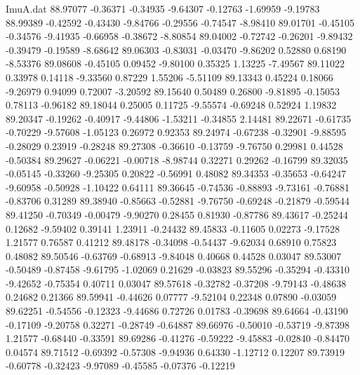 \begin{filecontents}{ImuA.dat}
  88.97077   -0.36371   -0.34935   -9.64307   -0.12763   -1.69959   -9.19783
  88.99389   -0.42592   -0.43430   -9.84766   -0.29556   -0.74547   -8.98410
  89.01701   -0.45105   -0.34576   -9.41935   -0.66958   -0.38672   -8.80854
  89.04002   -0.72742   -0.26201   -9.89432   -0.39479   -0.19589   -8.68642
  89.06303   -0.83031   -0.03470   -9.86202    0.52880    0.68190   -8.53376
  89.08608   -0.45105    0.09452   -9.80100    0.35325    1.13225   -7.49567
  89.11022    0.33978    0.14118   -9.33560    0.87229    1.55206   -5.51109
  89.13343    0.45224    0.18066   -9.26979    0.94099    0.72007   -3.20592
  89.15640    0.50489    0.26800   -9.81895   -0.15053    0.78113   -0.96182
  89.18044    0.25005    0.11725   -9.55574   -0.69248    0.52924    1.19832
  89.20347   -0.19262   -0.40917   -9.44806   -1.53211   -0.34855    2.14481
  89.22671   -0.61735   -0.70229   -9.57608   -1.05123    0.26972    0.92353
  89.24974   -0.67238   -0.32901   -9.88595   -0.28029    0.23919   -0.28248
  89.27308   -0.36610   -0.13759   -9.76750    0.29981    0.44528   -0.50384
  89.29627   -0.06221   -0.00718   -8.98744    0.32271    0.29262   -0.16799
  89.32035   -0.05145   -0.33260   -9.25305    0.20822   -0.56991    0.48082
  89.34353   -0.35653   -0.64247   -9.60958   -0.50928   -1.10422    0.64111
  89.36645   -0.74536   -0.88893   -9.73161   -0.76881   -0.83706    0.31289
  89.38940   -0.85663   -0.52881   -9.76750   -0.69248   -0.21879   -0.59544
  89.41250   -0.70349   -0.00479   -9.90270    0.28455    0.81930   -0.87786
  89.43617   -0.25244    0.12682   -9.59402    0.39141    1.23911   -0.24432
  89.45833   -0.11605    0.02273   -9.17528    1.21577    0.76587    0.41212
  89.48178   -0.34098   -0.54437   -9.62034    0.68910    0.75823    0.48082
  89.50546   -0.63769   -0.68913   -9.84048    0.40668    0.44528    0.03047
  89.53007   -0.50489   -0.87458   -9.61795   -1.02069    0.21629   -0.03823
  89.55296   -0.35294   -0.43310   -9.42652   -0.75354    0.40711    0.03047
  89.57618   -0.32782   -0.37208   -9.79143   -0.48638    0.24682    0.21366
  89.59941   -0.44626    0.07777   -9.52104    0.22348    0.07890   -0.03059
  89.62251   -0.54556   -0.12323   -9.44686    0.72726    0.01783   -0.39698
  89.64664   -0.43190   -0.17109   -9.20758    0.32271   -0.28749   -0.64887
  89.66976   -0.50010   -0.53719   -9.87398    1.21577   -0.68440   -0.33591
  89.69286   -0.41276   -0.59222   -9.45883   -0.02840   -0.84470    0.04574
  89.71512   -0.69392   -0.57308   -9.94936    0.64330   -1.12712    0.12207
  89.73919   -0.60778   -0.32423   -9.97089   -0.45585   -0.07376   -0.12219

\end{filecontents}
